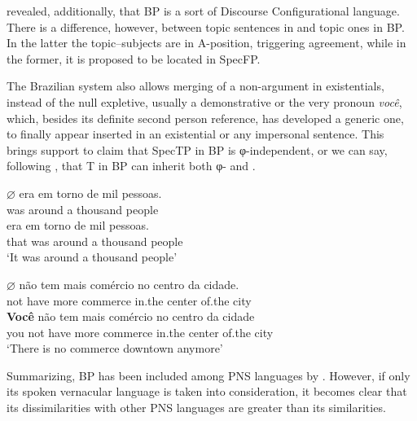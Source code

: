 \documentclass[output=paper]{langsci/langscibook}
\begin{document}
 revealed, additionally, that \gls{BP} is a sort of Discourse Configurational language. There is a
difference, however, between topic sentences in  and topic ones in
\gls{BP}. In the latter the topic--subjects are in
A-position, triggering agreement, while in the former, it is proposed to be
located in SpecFP.

The Brazilian system also allows merging of a non-argument in existentials,
instead of the null expletive, usually a demonstrative or the very pronoun
\emph{você}, which, besides its definite second person reference, has developed
a generic one, to finally appear inserted in an existential or any impersonal
sentence. This brings support to  claim that SpecTP
in \gls{BP} is φ-in\-de\-pen\-dent, or we can say,
following \citet{Miyagawa2010}, that T in \gls{BP} can
inherit both φ- and .

\ea%
    \label{ex:key:26.40bp}
    \ea
    \gll	\textbf{$\varnothing$\tss{\Expl}} era {em torno de}  mil pessoas.\\
			{} was  around   a thousand      people\\
    \ex
     era  {em torno de} mil pessoas.\\
			that was around a thousand       people\\
	\glt	\enquote*{It was around a thousand people}
    \z
\z

\ea%
    \label{ex:key:26.41}
    \ea
	\gll	\textbf{$\varnothing$\tss{\Expl}} não tem mais  comércio   no centro da      cidade.\\
			{} not have more commerce in.the center of.the city\\
    \ex
	\gll	\textbf{Você} não tem   mais comércio   no      centro da      cidade\\
			you   not have more commerce in.the center of.the city\\
	\glt	\enquote*{There is no commerce downtown anymore}
    \z
\z

Summarizing, \gls{BP} has been included among
\gls{PNS} languages by \citet{HolShee2010}. However, if only its spoken
vernacular language is taken into consideration, it becomes clear that its
dissimilarities with other \gls{PNS} languages are greater than  its
similarities.
\end{document}
